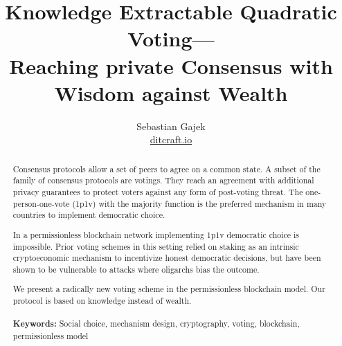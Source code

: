 \documentclass[12pt]{article}
\begin{document}
\title{Knowledge Extractable Quadratic Voting---\\
Reaching private Consensus with Wisdom against Wealth}
\author{Sebastian Gajek\\\url{ditcraft.io}}
\maketitle

\begin{abstract}
Consensus protocols allow a set of peers to agree on a common state. A subset of the family of consensus protocols are votings. They reach an agreement with additional privacy guarantees to protect voters against any form of post-voting threat. The one-person-one-vote (1p1v) with the majority function is the preferred mechanism in many countries to implement democratic choice.

In a permissionless blockchain network implementing 1p1v democratic choice is impossible.
Prior voting schemes in this setting relied on staking as an intrinsic cryptoeconomic mechanism to incentivize honest democratic decisions, but have been shown to be vulnerable to attacks where oligarchs bias the outcome. 

We present a radically new voting scheme in the permissionless blockchain model. Our protocol is based on knowledge instead of wealth. 
\\
\\\textbf{Keywords: } Social choice, mechanism design, cryptography, voting, blockchain, permissionless model
\end{abstract}




\end{document}
